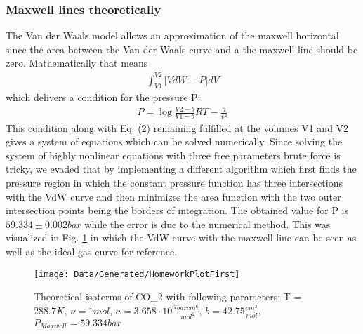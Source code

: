 \documentclass[a4paper,10pt,twocolumn]{article}
\begin{document}
    \subsubsection{Maxwell lines theoretically}\label{subsubsec:maxwellFromTheory}
    The Van der Waals model allows an approximation of the maxwell horizontal since the area between the Van der Waals curve and a the maxwell line should be zero.
    Mathematically that means
    \begin{align}
        \int_{V1}^{V2} |VdW - P| dV
        \end{align}
    which delivers a condition for the pressure P:
    \begin{align}
        P=\log\frac{V2-b}{V1-b} RT - \frac{a}{v^2}
    \end{align}
    This condition along with Eq. (2) remaining fulfilled at the volumes V1 and V2 gives a system of equations which can be solved numerically.
    Since solving the system of highly nonlinear equations with three free parameters brute force is tricky, we evaded that by implementing a different algorithm
    which first finds the pressure region in which the constant pressure function has three intersections with the VdW curve and then minimizes the area function
    with the two outer intersection points being the borders of integration.
    The obtained value for P is $59.334\pm 0.002 bar$ while the error is due to the numerical method.
    This was visualized in Fig. \ref{fig:homeworkPlotOne} in which the VdW curve with the maxwell line can be seen as well as the ideal gas curve for reference.
    \begin{figure}
        \begin{center}
            \texttt{[image: Data/Generated/HomeworkPlotFirst]}
            \caption[]{Theoretical isoterms of CO_2\) with following parameters:
            T = $288.7K$, $\nu=1 mol$, $a=3.658\cdot 10^6 \frac{bar cm^6}{mol^2}$, $b=42.75 \frac{cm^3}{mol}$, $P_{Maxwell}=59.334 bar$}
            \label{fig:homeworkPlotOne}
        \end{center}
    \end{figure}
    
\end{document}
